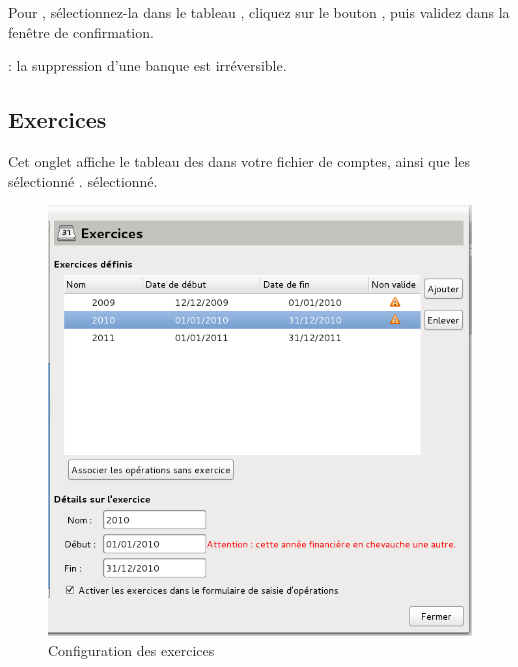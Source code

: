 Pour , sélectionnez-la dans le tableau , cliquez sur le bouton , puis validez dans la fenêtre de confirmation.

 : la suppression d'une banque est irréversible.




\subsection{Exercices\label{setup-resources-financialyear}}

Cet onglet affiche le tableau des  dans votre fichier de comptes, ainsi que les  \ifIllustration sélectionné . 
\else sélectionné.
\fi










\ifIllustration
\begin{figure}[ht]
\begin{center}
\includegraphics[scale=0.5]{image/screenshot/setup_financialyear}
\end{center}
\caption{Configuration des exercices}
\label{setup-financialyear-img}
\end{figure}
\fi

